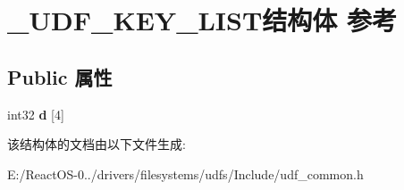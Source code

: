 \hypertarget{struct___u_d_f___k_e_y___l_i_s_t}{}\section{\+\_\+\+U\+D\+F\+\_\+\+K\+E\+Y\+\_\+\+L\+I\+S\+T结构体 参考}
\label{struct___u_d_f___k_e_y___l_i_s_t}
\subsection*{Public 属性}
\begin{DoxyCompactItemize}
\item 
\mbox{\label{struct___u_d_f___k_e_y___l_i_s_t_af84b489fca6b8535d5bc140d89a59e46}} 
int32 {\bfseries d} \mbox{[}4\mbox{]}
\end{DoxyCompactItemize}


该结构体的文档由以下文件生成\+:\begin{DoxyCompactItemize}
\item 
E\+:/\+React\+O\+S-\/0../drivers/filesystems/udfs/\+Include/udf\+\_\+common.\+h\end{DoxyCompactItemize}
